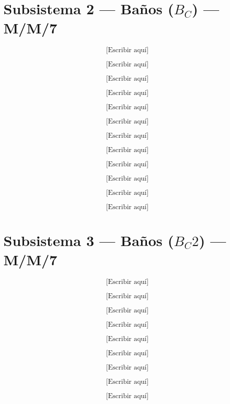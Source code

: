 \documentclass[12pt,a4paper]{article}
\begin{document}
\vspace{1cm}
\section*{Subsistema 2 — Baños ($B_C$) — M/M/7}

\[
\text{[Escribir aquí]} \tag{2.1}
\]

\[
\text{[Escribir aquí]} \tag{2.2}
\]

\[
\text{[Escribir aquí]} \tag{2.3}
\]

\[
\text{[Escribir aquí]} \tag{2.4}
\]

\[
\text{[Escribir aquí]} \tag{2.5}
\]

\[
\text{[Escribir aquí]} \tag{2.6}
\]

\[
\text{[Escribir aquí]} \tag{2.7}
\]

\[
\text{[Escribir aquí]} \tag{2.8}
\]

\[
\text{[Escribir aquí]} \tag{2.9}
\]

\[
\text{[Escribir aquí]} \tag{2.10}
\]

\[
\text{[Escribir aquí]} \tag{2.11}
\]

\[
\text{[Escribir aquí]} \tag{2.12}
\]

\vspace{1cm}
\section*{Subsistema 3 — Baños ($B_C 2$) — M/M/7}

\[
\text{[Escribir aquí]} \tag{3.1}
\]

\[
\text{[Escribir aquí]} \tag{3.2}
\]

\[
\text{[Escribir aquí]} \tag{3.3}
\]

\[
\text{[Escribir aquí]} \tag{3.4}
\]

\[
\text{[Escribir aquí]} \tag{3.5}
\]

\[
\text{[Escribir aquí]} \tag{3.6}
\]

\[
\text{[Escribir aquí]} \tag{3.7}
\]

\[
\text{[Escribir aquí]} \tag{3.8}
\]

\[
\text{[Escribir aquí]} \tag{3.9}
\]
\end{document}
